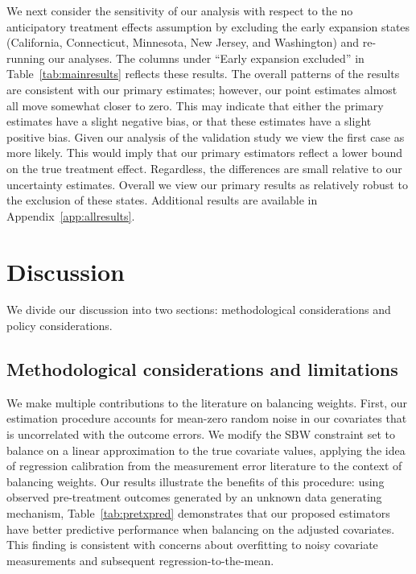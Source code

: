 \documentclass[aoas]{imsart}
\theoremstyle{plain}
\theoremstyle{remark}
\begin{document}
We next consider the sensitivity of our analysis with respect to the no anticipatory treatment effects assumption by excluding the early expansion states (California, Connecticut, Minnesota, New Jersey, and Washington) and re-running our analyses. The columns under ``Early expansion excluded'' in Table~\ref{tab:mainresults} reflects these results. The overall patterns of the results are consistent with our primary estimates; however, our point estimates almost all move somewhat closer to zero. This may indicate that either the primary estimates have a slight negative bias, or that these estimates have a slight positive bias. Given our analysis of the validation study we view the first case as more likely. This would imply that our primary estimators reflect a lower bound on the true treatment effect. Regardless, the differences are small relative to our uncertainty estimates. Overall we view our primary results as relatively robust to the exclusion of these states. Additional results are available in Appendix~\ref{app:allresults}.

\section{Discussion}

We divide our discussion into two sections: methodological considerations and policy considerations. 

\subsection{Methodological considerations and limitations}

We make multiple contributions to the literature on balancing weights. First, our estimation procedure accounts for mean-zero random noise in our covariates that is uncorrelated with the outcome errors. We modify the SBW constraint set to balance on a linear approximation to the true covariate values, applying the idea of regression calibration from the measurement error literature to the context of balancing weights. Our results illustrate the benefits of this procedure: using observed pre-treatment outcomes generated by an unknown data generating mechanism, Table~\ref{tab:pretxpred} demonstrates that our proposed estimators have better predictive performance when balancing on the adjusted covariates. This finding is consistent with concerns about overfitting to noisy covariate measurements and subsequent regression-to-the-mean.
\end{document}
